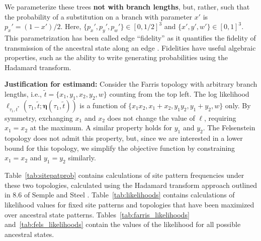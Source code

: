 \documentclass[a4paper]{article}
\newcommand{\fullAncestralSplitPartitions}{\boldsymbol\eta}
\begin{document}
We parameterize these trees \textbf{not with branch lengths}, but, rather, such that the probability of a substitution on a branch with parameter $x'$ is $p_x'=(1-x')/2$.
Here, $\{p_x',p_y',p_w'\}\in[0,1/2]^3$ and $\{x',y',w'\}\in[0,1]^3$.
This parametrization has been called edge ``fidelity'' as it quantifies the fidelity of transmission of the ancestral state along an edge \cite{Matsen2007-jq}.
Fidelities have useful algebraic properties, such as the ability to write generating probabilities using the Hadamard transform.

\textbf{Justification for estimand:} Consider the Farris topology with arbitrary branch lengths, i.e., $\tilde{t}=\{x_1,y_1,x_2,y_2,w\}$ counting from the top left.
The log likelihood $\ell_{\tau_1,t^*}(\tau_1, \tilde{t}; \fullAncestralSplitPartitions(\tau_1,\tilde{t}))$ is a function of $\{x_1x_2, x_1+x_2, y_1y_2, y_1+y_2, w\}$ only.
By symmetry, exchanging $x_1$ and $x_2$ does not change the value of $\ell$, requiring $x_1=x_2$ at the maximum.
A similar property holds for $y_1$ and $y_2$.
The Felsenstein topology does not admit this property, but, since we are interested in a lower bound for this topology, we simplify the objective function by constraining $x_1=x_2$ and $y_1=y_2$ similarly.

Table~\ref{tab:sitepatprob} contains calculations of site pattern frequencies under these two topologies, calculated using the Hadamard transform approach outlined in 8.6 of Semple and Steel \cite{Semple2003-em}.
Table~\ref{tab:likelihoods} contains calculations of likelihood values for fixed site patterns and topologies that have been maximized over ancestral state patterns.
Tables~\ref{tab:farris_likelihoods} and~\ref{tab:fels_likelihoods} contain the values of the likelihood for all possible ancestral states.
\end{document}
